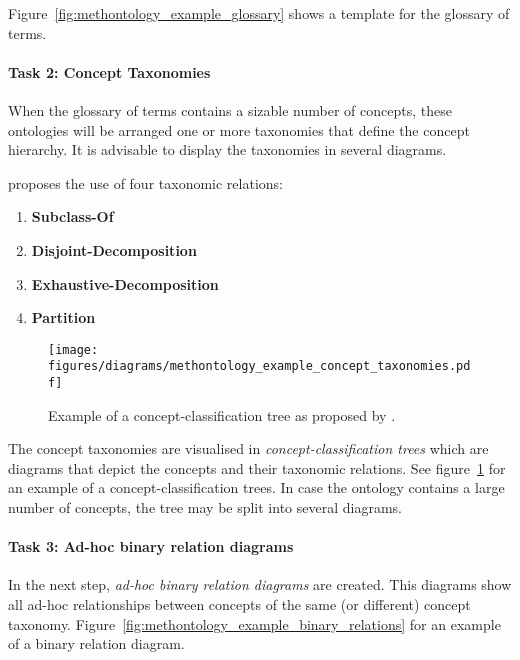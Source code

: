 Figure~\ref{fig:methontology_example_glossary} shows a template for the glossary of terms.

\paragraph{Task 2: Concept Taxonomies}

When the glossary of terms contains a sizable number of concepts, these ontologies will be arranged one or more taxonomies that define the concept hierarchy. It is advisable to display the taxonomies in several diagrams.

\methontology proposes the use of four taxonomic relations:
\begin{enumerate}
  \item \textbf{Subclass-Of}
  \item \textbf{Disjoint-Decomposition}
  \item \textbf{Exhaustive-Decomposition}
  \item \textbf{Partition}
\end{enumerate}


\begin{figure}
\centering
\texttt{[image: figures/diagrams/methontology\_example\_concept\_taxonomies.pdf]}
\caption{Example of a concept-classification tree as proposed by \methontology.}
\label{fig:methontology_example_concept_taxonomies}
\end{figure}

The concept taxonomies are visualised in \emph{concept-classification trees} which are diagrams that depict the concepts and their taxonomic relations. See figure~\ref{fig:methontology_example_concept_taxonomies} for an example of a concept-classification trees. In case the ontology contains a large number of concepts, the tree may be split into several diagrams.

\paragraph{Task 3: Ad-hoc binary relation diagrams}

In the next step, \emph{ad-hoc binary relation diagrams} are created. This diagrams show all ad-hoc relationships between concepts of the same (or different) concept taxonomy. Figure~\ref{fig:methontology_example_binary_relations} for an example of a binary relation diagram.

